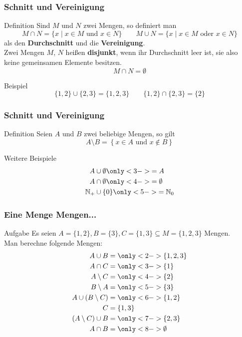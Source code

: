 \begin{frame}
	\frametitle{Schnitt und Vereinigung}
	
	\begin{block}{Definition}
		Sind $M$ und $N$ zwei Mengen, so definiert man
		$$M \cap N = \{x \mid x \in M \text{ und } x \in N\} \qquad M \cup N = \{x \mid x \in M \text{ oder } x \in N\} $$
		als den \textbf{Durchschnitt} und die \textbf{Vereinigung}.\\[1em] 
		\pause
		Zwei Mengen $M$, $N$ heißen \textbf{disjunkt}, wenn ihr Durchschnitt leer ist, sie also keine gemeinsamen Elemente besitzen. $$M \cap N = \emptyset$$
	\end{block}

	\pause
	\begin{block}{Beispiel}
		$$ \{1,2\} \cup \{2,3\} = \{1,2,3\} \qquad \{1,2\} \cap \{2,3\} = \{2\} $$
	\end{block}

\end{frame}

\begin{frame}
	\frametitle{Schnitt und Vereinigung}
	\begin{block}{Definition}
		Seien $A$ und $B$ zwei beliebige Mengen, so gilt $$ A\setminus B = \left\{ x\in A \text{ und } x\notin  B  \right\} $$ 
	\end{block}
	
	\pause

	\begin{block}{Weitere Beispiele}
		\begin{align*}
			A &\cup \emptyset \only<3->{ = A }  \\
			A &\cap \emptyset \only<4->{ = \emptyset }\\
			\nN_+ &\cup \{0\} \only<5->{ = \nN_0} \\
		\end{align*}
	\end{block}

\end{frame}

\begin{frame}
	\frametitle{Eine Menge Mengen...}
	\begin{block}{Aufgabe}
		Es seien $A = \{1, 2\}, B = \{3\}, C = \{1, 3\}  \subseteq M = \{1, 2, 3\}$ Mengen.\\
		Man berechne folgende Mengen:
		\begin{align*}
		A \cup B &= \only<2->{ \{1, 2, 3\} }  \\
		A \cap C &= \only<3->{ \{1\} }\\
		A \setminus C &= \only<4->{ \{2\} }\\
		B \setminus A &= \only<5->{ \{3\} }\\
		A \cup (B \setminus C) &= \only<6->{ \{1, 2\} }\\
		C &= \{1, 3\} \\
		(A \setminus C) \cup B &= \only<7->{ \{2, 3\} }\\
		A \cap B &= \only<8->{ \emptyset }
		\end{align*}
	\end{block}
\end{frame}

